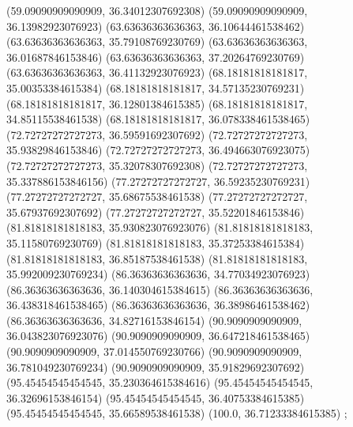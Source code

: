 {{{		(59.09090909090909, 36.34012307692308)
		(59.09090909090909, 36.13982923076923)
		(63.63636363636363, 36.10644461538462)
		(63.63636363636363, 35.79108769230769)
		(63.63636363636363, 36.01687846153846)
		(63.63636363636363, 37.20264769230769)
		(63.63636363636363, 36.41132923076923)
		(68.18181818181817, 35.00353384615384)
		(68.18181818181817, 34.57135230769231)
		(68.18181818181817, 36.12801384615385)
		(68.18181818181817, 34.85115538461538)
		(68.18181818181817, 36.078338461538465)
		(72.72727272727273, 36.59591692307692)
		(72.72727272727273, 35.93829846153846)
		(72.72727272727273, 36.494663076923075)
		(72.72727272727273, 35.32078307692308)
		(72.72727272727273, 35.337886153846156)
		(77.27272727272727, 36.59235230769231)
		(77.27272727272727, 35.68675538461538)
		(77.27272727272727, 35.67937692307692)
		(77.27272727272727, 35.52201846153846)
		(81.81818181818183, 35.930823076923076)
		(81.81818181818183, 35.11580769230769)
		(81.81818181818183, 35.37253384615384)
		(81.81818181818183, 36.85187538461538)
		(81.81818181818183, 35.992009230769234)
		(86.36363636363636, 34.77034923076923)
		(86.36363636363636, 36.140304615384615)
		(86.36363636363636, 36.438318461538465)
		(86.36363636363636, 36.38986461538462)
		(86.36363636363636, 34.82716153846154)
		(90.9090909090909, 36.043823076923076)
		(90.9090909090909, 36.647218461538465)
		(90.9090909090909, 37.014550769230766)
		(90.9090909090909, 36.781049230769234)
		(90.9090909090909, 35.91829692307692)
		(95.45454545454545, 35.230364615384616)
		(95.45454545454545, 36.32696153846154)
		(95.45454545454545, 36.40753384615385)
		(95.45454545454545, 35.66589538461538)
		(100.0, 36.71233384615385)
	};

}}

